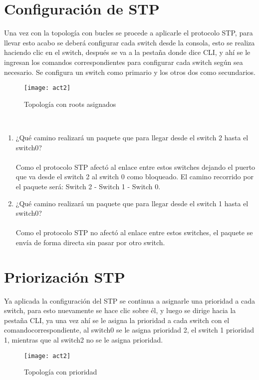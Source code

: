 \documentclass{udpreport}
\begin{document}
	\section{Configuración de STP}
	Una vez con la topología con bucles se procede a aplicarle el protocolo STP, para llevar esto acabo se deberá configurar cada
	switch desde la consola, esto se realiza haciendo clic en el switch, después se va a la pestaña donde dice CLI, y ahí se le
	ingresan los comandos correspondientes para configurar cada switch según sea necesario. Se configura un switch como
	primario y los otros dos como secundarios.\\
	\begin{figure}[H]
	\centering
	\texttt{[image: act2]}
	\caption{Topología con roots asignados}
	\end{figure}\\
    \begin{enumerate}
	    \item ¿Qué camino realizará un paquete que para llegar desde el switch
2 hasta el switch0?\\\\
        Como el protocolo STP afectó al enlace entre estos switches dejando el puerto que va desde el switch 2 al switch 0 como bloqueado. El camino recorrido por el paquete será: Switch 2 - Switch 1 - Switch 0. 
        \item  ¿Qué camino realizará un paquete que para llegar desde el switch
1 hasta el switch0?\\\\
          Como el protocolo STP no afectó al enlace entre estos switches, el paquete se envía de forma directa sin pasar por otro switch.
          \vfill 
	\end{enumerate}
	\section{Priorización STP}
	   
	    Ya aplicada la configuración del STP se continua a asignarle una prioridad a cada switch,  para esto nuevamente se hace clic	sobre él, y luego se dirige hacia la pestaña CLI, ya una vez ahí se le asigna la prioridad a cada switch con el comandocorrespondiente, al switch0 se le asigna prioridad 2, el switch 1 prioridad 1, mientras que al switch2 no se le asigna prioridad.
        \begin{figure}[H]
	\centering
	\texttt{[image: act2]}
	\caption{Topología con prioridad}
	\end{figure}
	\vfill 
\end{document}
